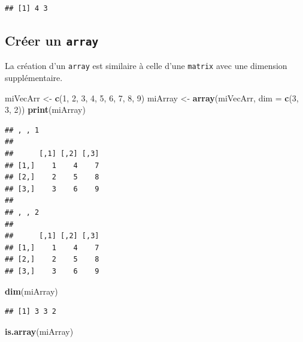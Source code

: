 \documentclass[]{book}
\newenvironment{Shaded}{\begin{snugshade}}{\end{snugshade}}
\newcommand{\DataTypeTok}[1]{\textcolor[rgb]{0.13,0.29,0.53}{#1}}
\newcommand{\DecValTok}[1]{\textcolor[rgb]{0.00,0.00,0.81}{#1}}
\newcommand{\KeywordTok}[1]{\textcolor[rgb]{0.13,0.29,0.53}{\textbf{#1}}}
\newcommand{\NormalTok}[1]{#1}
\newcommand{\StringTok}[1]{\textcolor[rgb]{0.31,0.60,0.02}{#1}}
\begin{document}
\begin{verbatim}
## [1] 4 3
\end{verbatim}

\hypertarget{creer-un-array}{%
\subsection{\texorpdfstring{Créer un \texttt{array}}{Créer un array}}\label{creer-un-array}}

La création d'un \texttt{array} est similaire à celle d'une \texttt{matrix} avec une dimension supplémentaire.

\begin{Shaded}
\begin{Highlighting}[]
\NormalTok{miVecArr <-}\StringTok{ }\KeywordTok{c}\NormalTok{(}\DecValTok{1}\NormalTok{, }\DecValTok{2}\NormalTok{, }\DecValTok{3}\NormalTok{, }\DecValTok{4}\NormalTok{, }\DecValTok{5}\NormalTok{, }\DecValTok{6}\NormalTok{, }\DecValTok{7}\NormalTok{, }\DecValTok{8}\NormalTok{, }\DecValTok{9}\NormalTok{)}
\NormalTok{miArray <-}\StringTok{ }\KeywordTok{array}\NormalTok{(miVecArr, }\DataTypeTok{dim =} \KeywordTok{c}\NormalTok{(}\DecValTok{3}\NormalTok{, }\DecValTok{3}\NormalTok{, }\DecValTok{2}\NormalTok{))}
\KeywordTok{print}\NormalTok{(miArray)}
\end{Highlighting}
\end{Shaded}

\begin{verbatim}
## , , 1
## 
##      [,1] [,2] [,3]
## [1,]    1    4    7
## [2,]    2    5    8
## [3,]    3    6    9
## 
## , , 2
## 
##      [,1] [,2] [,3]
## [1,]    1    4    7
## [2,]    2    5    8
## [3,]    3    6    9
\end{verbatim}

\begin{Shaded}
\begin{Highlighting}[]
\KeywordTok{dim}\NormalTok{(miArray)}
\end{Highlighting}
\end{Shaded}

\begin{verbatim}
## [1] 3 3 2
\end{verbatim}

\begin{Shaded}
\begin{Highlighting}[]
\KeywordTok{is.array}\NormalTok{(miArray)}
\end{Highlighting}
\end{Shaded}
\end{document}
